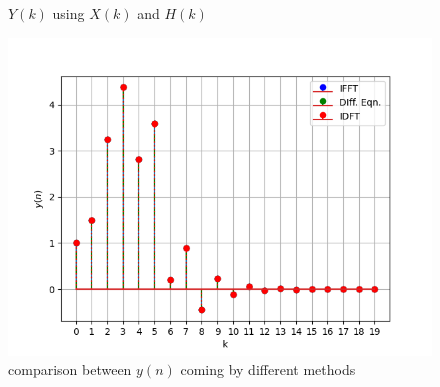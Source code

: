 \documentclass[journal,12pt,twocolumn]{IEEEtran}
\renewcommand\thesection{\arabic{section}}
\begin{document}
\begin{enumerate}[label=\thesection.\arabic*]
\begin{figure}[!ht]
	\caption{$Y(k)$ using $X(k)$ and $H(k)$}
	\label{fig:Y_fft}
\end{figure}
\begin{figure}[!ht]
	\centering
	\includegraphics[width=\columnwidth]{./ques_6/y_ifft}
	\caption{comparison between $y(n)$ coming by different methods}
	\label{fig:y_ifft}
\end{figure}
\end{enumerate}
\end{document}
